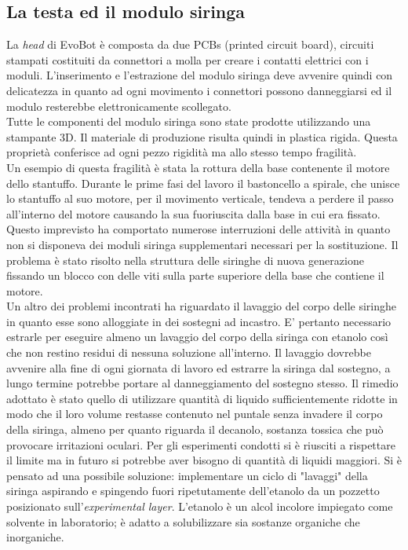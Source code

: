 \subsection{La testa ed il modulo siringa}
La \emph{head} di EvoBot è composta da due PCBs (printed circuit board), circuiti stampati costituiti da connettori a molla per creare i contatti elettrici con i moduli. L'inserimento e l'estrazione del modulo siringa deve avvenire quindi con delicatezza in quanto ad ogni movimento i connettori possono danneggiarsi ed il modulo resterebbe elettronicamente scollegato.
\\Tutte le componenti del modulo siringa sono state prodotte utilizzando una stampante 3D. Il materiale di produzione risulta quindi in plastica rigida. Questa proprietà conferisce ad ogni pezzo rigidità ma allo stesso tempo fragilità.
\\Un esempio di questa fragilità è stata la rottura della base contenente il motore dello stantuffo. Durante le prime fasi del lavoro il bastoncello a spirale, che unisce lo stantuffo al suo motore, per il movimento verticale, tendeva a perdere il passo all'interno del motore causando la sua fuoriuscita dalla base in cui era fissato. 
Questo imprevisto ha comportato numerose interruzioni delle attività in quanto non si disponeva dei moduli siringa supplementari necessari per la sostituzione. Il problema è stato risolto nella struttura delle siringhe di nuova generazione fissando un blocco con delle viti sulla parte superiore della base che contiene il motore. 
\\Un altro dei problemi incontrati ha riguardato il lavaggio del corpo delle siringhe in quanto esse sono alloggiate in dei sostegni ad incastro. E’ pertanto necessario estrarle per eseguire almeno un lavaggio del corpo della siringa con etanolo così che non restino residui di nessuna soluzione all'interno. Il lavaggio dovrebbe avvenire alla fine di ogni giornata di lavoro ed estrarre la siringa dal sostegno, a lungo termine potrebbe portare al danneggiamento del sostegno stesso. Il rimedio adottato è stato quello di utilizzare quantità di liquido sufficientemente ridotte in modo che il loro volume restasse contenuto nel puntale senza invadere il corpo della siringa, almeno per quanto riguarda il decanolo, sostanza tossica che può provocare irritazioni oculari. Per gli esperimenti condotti si è riusciti a rispettare il limite ma in futuro si potrebbe aver bisogno di quantità di liquidi maggiori. Si è pensato ad una possibile soluzione: implementare un ciclo di "lavaggi" della siringa aspirando e spingendo fuori ripetutamente dell'etanolo da un pozzetto posizionato sull'\emph{experimental layer}. L'etanolo è un alcol incolore impiegato come solvente in laboratorio; è adatto a solubilizzare sia sostanze organiche che inorganiche. 
